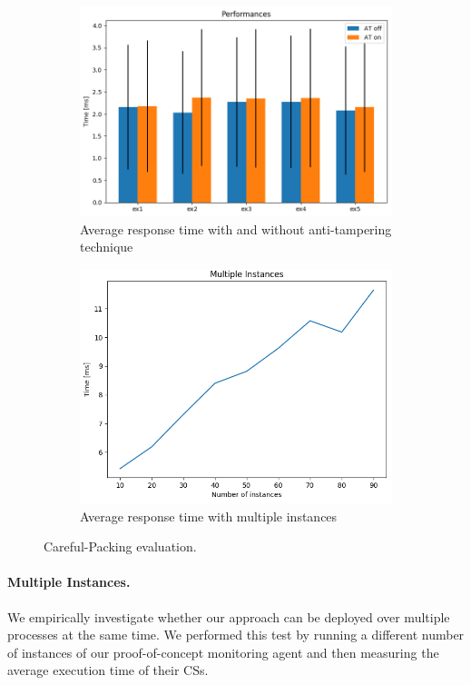\begin{figure}[t]
	\centering
	\begin{subfigure}[t]{0.45\textwidth}
		\includegraphics[width=\linewidth]{fig_c3/performanceEvaluation}
		\caption{Average response time with and without anti-tampering 
		technique}
		\label{fig:performanceEvaluation}
	\end{subfigure}
	\hfill
	\begin{subfigure}[t]{0.45\textwidth}
		\includegraphics[width=\linewidth]{fig_c3/multiple}
		\caption{Average response time with multiple instances}
		\label{fig:multiple}
	\end{subfigure}
	\caption{Careful-Packing evaluation.}
	\label{fig:performance2}
\end{figure}

\paragraph{Multiple Instances.}
We empirically investigate whether our approach can be deployed over multiple 
processes at the same time.
We performed this test by running a different number of instances of our 
proof-of-concept monitoring agent and then measuring the average execution time 
of their CSs.

